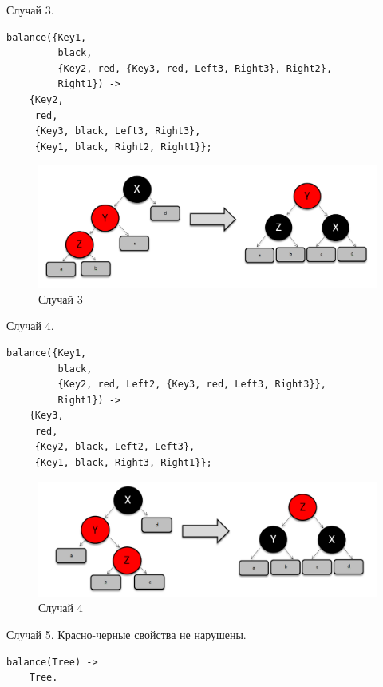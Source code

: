 			Случай 3.
			\begin{lstlisting}
balance({Key1, 
         black, 
         {Key2, red, {Key3, red, Left3, Right3}, Right2}, 
         Right1}) ->  
    {Key2, 
     red, 
     {Key3, black, Left3, Right3}, 
     {Key1, black, Right2, Right1}};	    
			\end{lstlisting}
			\begin{figure}[H]
				\centering
				\includegraphics[width=\textwidth]{img/insert/clause_3.png}
				\caption{Случай 3}
			\end{figure}
			
			Случай 4.
			\begin{lstlisting}
balance({Key1, 
         black, 
         {Key2, red, Left2, {Key3, red, Left3, Right3}}, 
         Right1}) ->   
    {Key3, 
     red, 
     {Key2, black, Left2, Left3}, 
     {Key1, black, Right3, Right1}};	    
			\end{lstlisting}
			\begin{figure}[H]
				\centering
				\includegraphics[width=\textwidth]{img/insert/clause_4.png}
				\caption{Случай 4}
			\end{figure}
			
			Случай 5. Красно-черные свойства не нарушены.
			\begin{lstlisting}
balance(Tree) -> 
    Tree.	
			\end{lstlisting}
			
